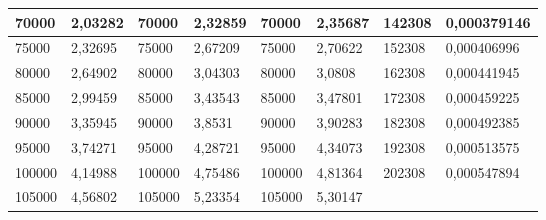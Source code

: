 \documentclass[11pt,openany]{book}
\begin{document}
\begin{table}[!ht]
\begin{tabular}{|l|l|l|l|l|l|l|l|}
        70000                                             & 2,03282                                            & 70000                                               & 2,32859                                             & 70000           & 2,35687         & 142308          & 0,000379146     \\ \hline
        75000                                             & 2,32695                                            & 75000                                               & 2,67209                                             & 75000           & 2,70622         & 152308          & 0,000406996     \\ \hline
        80000                                             & 2,64902                                            & 80000                                               & 3,04303                                             & 80000           & 3,0808          & 162308          & 0,000441945     \\ \hline
        85000                                             & 2,99459                                            & 85000                                               & 3,43543                                             & 85000           & 3,47801         & 172308          & 0,000459225     \\ \hline
        90000                                             & 3,35945                                            & 90000                                               & 3,8531                                              & 90000           & 3,90283         & 182308          & 0,000492385     \\ \hline
        95000                                             & 3,74271                                            & 95000                                               & 4,28721                                             & 95000           & 4,34073         & 192308          & 0,000513575     \\ \hline
        100000                                            & 4,14988                                            & 100000                                              & 4,75486                                             & 100000          & 4,81364         & 202308          & 0,000547894     \\ \hline
        105000                                            & 4,56802                                            & 105000                                              & 5,23354                                             & 105000          & 5,30147         & ~               & ~               \\ \hline

\end{tabular}
\end{table}
\end{document}
